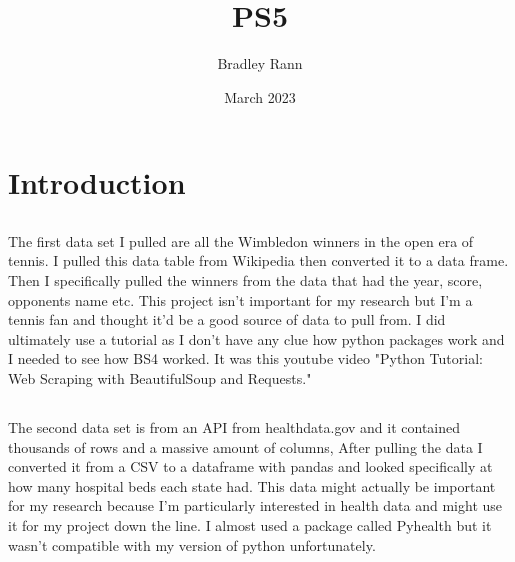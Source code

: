 \documentclass{article}
\title{PS5}
\author{Bradley Rann }
\date{March 2023}
\begin{document}
\maketitle

\section{Introduction}
\subsection{}
The first data set I pulled are all the Wimbledon winners in the open era of tennis. I pulled this data table from Wikipedia then converted it to a data frame. Then I specifically pulled the winners from the data that had the year, score, opponents name etc. This project isn't important for my research but I'm a tennis fan and thought it'd be a good source of data to pull from. I did ultimately use a tutorial as I don't have any clue how python packages work and I needed to see how BS4 worked. It was this youtube video "Python Tutorial: Web Scraping with BeautifulSoup and Requests."
\subsection{}
The second data set is from an API from healthdata.gov and it contained thousands of rows and a massive amount of columns, After pulling the data I converted it from a CSV to a dataframe with pandas and looked specifically at how many hospital beds each state had. This data might actually be important for my research because I'm particularly interested in health data and might use it for my project down the line. I almost used a package called Pyhealth but it wasn't compatible with my version of python unfortunately.
\end{document}
